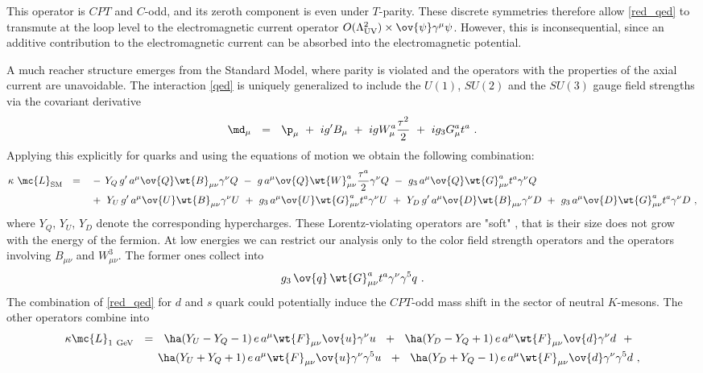 \documentclass[prl,tightenlines]{revtex4}
\begin{document}
This operator is $CPT$ and $ C $-odd, and its zeroth component is even under $ T $-parity. 
These discrete symmetries therefore allow \eqref{red_qed} to transmute at 
the loop level to the electromagnetic current operator
$O(\Lambda_{\rm UV}^2)\times \ov{\psi} \gamma^\mu \psi $.
However, this is inconsequential, since an additive contribution to the electromagnetic
current can be absorbed into the electromagnetic potential.

A much reacher structure emerges from the Standard Model, where parity is violated and the operators with 
the properties of the axial current are unavoidable. 
The interaction \eqref{qed} is uniquely generalized to include the $ U(1) $, $ SU(2) $ and the $ SU(3) $ gauge field
strengths via the covariant derivative
\[
	\md_\mu ~~=~~ \p_\mu ~+~ i g' B_\mu ~+~ i g W_\mu^a \frac{\tau^2}{2} ~+~ i g_3 G_\mu^a t^a~.
\]
Applying this explicitly for quarks and using the equations of motion we obtain the following combination:
\begin{align}
%
\notag
\kappa~\mc{L}_{\rm SM} ~~=~~ & ~-\, Y_Q\, g'\, a^\mu \ov{Q} \wt{B}_{\mu\nu} \gamma^\nu Q 
		     ~-~ g\, a^\mu \ov{Q} \wt{W}_{\mu\nu}^a \frac{\tau^a}{2} \gamma^\nu Q 
		     ~-~ g_3\, a^\mu \ov{Q} \wt{G}_{\mu\nu}^a t^a \gamma^\nu Q \\
%
\label{sm}
	     & ~+~ Y_U\, g'\, a^\mu \ov{U} \wt{B}_{\mu\nu} \gamma^\nu U ~+~ g_3\, a^\mu \ov{U} \wt{G}_{\mu\nu}^a t^a \gamma^\nu U 
	      ~+~ Y_D\, g'\, a^\mu \ov{D} \wt{B}_{\mu\nu} \gamma^\nu D ~+~ g_3\, a^\mu \ov{D} \wt{G}_{\mu\nu}^a t^a \gamma^\nu D
			~,
\end{align}
where $ Y_Q $, $ Y_U $, $ Y_D $ denote the corresponding hypercharges. 
These Lorentz-violating operators are "soft" \cite{Bolokhov:2007yc}, that is their size does not grow with the 
energy of the fermion. 
At low energies we can restrict our analysis only to the color field strength operators and the operators involving $ B_{\mu\nu} $
and $ W_{\mu\nu}^3 $.
The former ones collect into
\[
	g_3\, \ov{q}\, \wt{G}_{\mu\nu}^a t^a \gamma^\nu \gamma^5 q~.
\]
The combination of \eqref{red_qed} for $d$ and $s$ quark could potentially induce the $CPT$-odd mass shift in the 
sector of neutral $K$-mesons.
The other operators combine into 
\begin{align}
\notag
	\kappa \mc{L}_{\rm 1~GeV} ~~=~~
	\ha( Y_U - Y_Q - 1 )\, e\, a^\mu \wt{F}_{\mu\nu} \ov{u} \gamma^\nu u ~~+~~
	\ha( Y_D - Y_Q + 1 )\, e\, a^\mu \wt{F}_{\mu\nu} \ov{d} \gamma^\nu d ~~+~~ \\
%
\label{sm_red}
	\ha( Y_U + Y_Q + 1 )\, e\, a^\mu \wt{F}_{\mu\nu} \ov{u} \gamma^\nu \gamma^5 u ~~+~~
	\ha( Y_D + Y_Q - 1 )\, e\, a^\mu \wt{F}_{\mu\nu} \ov{d} \gamma^\nu \gamma^5 d~,
\end{align}
\end{document}
